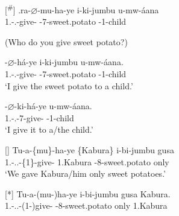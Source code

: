 \documentclass[output=paper]{langscibook}
\begin{document}
\ex 
\begin{xlist}
\exi{\CJ}
[\textsuperscript{\#}]{
\gll
\N{}.ra-$\varnothing$-mu-ha-ye  i-ki-jumbu  u-mw-áana\\
1\SG.\SM-\PRS.\OM-{}give-\PFV{}  \AUG{}-7-sweet.potato  \AUG{}-1-child\\
\glt
}
\end{xlist}


\z
\z

\ea
\label{bkm:Ref72332347}
(Who do you give sweet potato?)\\
\ea
\begin{xlist}
\exi{\CJ}
\gll
\N-{}$\varnothing$-há-ye  i-ki-jumbu  u-mw-áana.\\
1\SG.\SM-\PRS.\CJ{}-give-\PFV{}  \AUG{}-7-sweet.potato  \AUG{}-1-child\\
\glt
‘I give the sweet potato to a child.’\\
\end{xlist}

\ex  
\begin{xlist}
\exi{\CJ}
\gll
\N-{}$\varnothing$-ki-há-ye  u-mw-áana.\\
1\SG.\SM-\PRS.\CJ{}-7\OM{}-give-\PFV{}  \AUG{}-1-child\\
\glt
      ‘I give it to a/the child.’\\
\end{xlist}

\z
\z



\ea
\label{bkm:Ref72332358}

\ea
[]{
\gll
Tu-a-\{mu\}-ha-ye  \{Kabura\}  i-bi-jumbu  gusa\\
1\PL.\SM-\N.\PST.\CJ{}-\{1\OM{}\}-give-\PFV{}  {\db}1.Kabura  \AUG{}-8-sweet.potato  only\\
\glt
‘We gave Kabura/him only sweet potatoes.’\\
}

\ex
[*]{
\gll
Tu-a-(mu-)ha-ye  i-bi-jumbu  gusa  Kabura.\\
1\PL.\SM-\N.\PST.\CJ{}-(1\OM{}-)give-\PFV{}  \AUG{}-8-sweet.potato  only  1.Kabura\\
\glt
}
\end{document}
